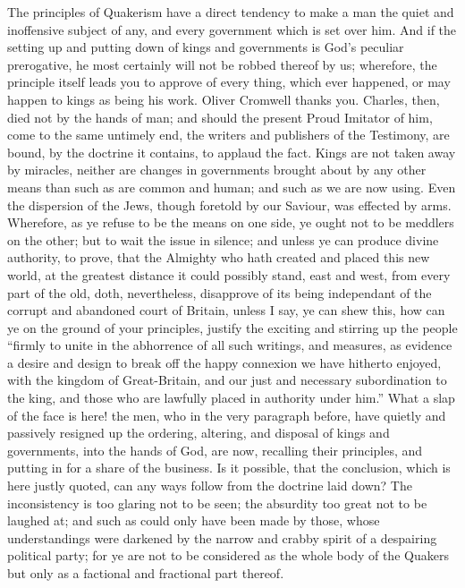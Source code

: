\documentclass[12pt,oneside]{memoir}
\begin{document}
The principles of Quakerism have a direct tendency to make a man the quiet and inoffensive subject of any, and every government which is set over him. And if the setting up and putting down of kings and governments is God's peculiar prerogative, he most certainly will not be robbed thereof by us; wherefore, the principle itself leads you to approve of every thing, which ever happened, or may happen to kings as being his work. Oliver Cromwell thanks you. Charles, then, died not by the hands of man; and should the present Proud Imitator of him, come to the same untimely end, the writers and publishers of the Testimony, are bound, by the doctrine it contains, to applaud the fact. Kings are not taken away by miracles, neither are changes in governments brought about by any other means than such as are common and human; and such as we are now using. Even the dispersion of the Jews, though foretold by our Saviour, was effected by arms. Wherefore, as ye refuse to be the means on one side, ye ought not to be meddlers on the other; but to wait the issue in silence; and unless ye can produce divine authority, to prove, that the Almighty who hath created and placed this new world, at the greatest distance it could possibly stand, east and west, from every part of the old, doth, nevertheless, disapprove of its being independant of the corrupt and abandoned court of Britain, unless I say, ye can shew this, how can ye on the ground of your principles, justify the exciting and stirring up the people ``firmly to unite in the abhorrence of all such writings, and measures, as evidence a desire and design to break off the happy connexion we have hitherto enjoyed, with the kingdom of Great-Britain, and our just and necessary subordination to the king, and those who are lawfully placed in authority under him.'' What a slap of the face is here! the men, who in the very paragraph before, have quietly and passively resigned up the ordering, altering, and disposal of kings and governments, into the hands of God, are now, recalling their principles, and putting in for a share of the business. Is it possible, that the conclusion, which is here justly quoted, can any ways follow from the doctrine laid down? The inconsistency is too glaring not to be seen; the absurdity too great not to be laughed at; and such as could only have been made by those, whose understandings were darkened by the narrow and crabby spirit of a despairing political party; for ye are not to be considered as the whole body of the Quakers but only as a factional and fractional part thereof.
\end{document}
